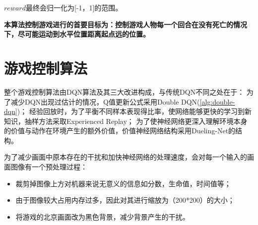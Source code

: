 $reward$最终会归一化为[-1，1]的范围。

\textbf{本算法控制游戏进行的首要目标为：控制游戏人物每一个回合在没有死亡的情况下，尽可能运动到水平位置距离起点远的位置。}
\section{游戏控制算法}
整个游戏控制算法由DQN算法及其三大改进构成，与传统DQN不同之处在于：
为了减少DQN出现过估计的情况，Q值更新公式采用Double DQN(\ref{alg:double-dqn})；
  经验回放时，为了平衡不同样本表现得比率，使网络能够更快的学习到新知识，抽样方法采取Experienced Replay；
  为了使神经网络更深入理解环境本身的价值与动作在环境产生的额外价值，价值神经网络结构采用Dueling-Net的结构。

为了减少画面中原本存在的干扰和加快神经网络的处理速度，会对每一个输入的画面图像有一个预处理过程：
\begin{itemize}
  \item 裁剪掉图像上方对机器来说无意义的信息如分数，生命值，时间值等；
  \item 由于图像较大占用内存过多，因此对其进行缩放为（200*200）的大小；
  \item 将游戏的北京画面改为黑色背景，减少背景产生的干扰。
\end{itemize}

